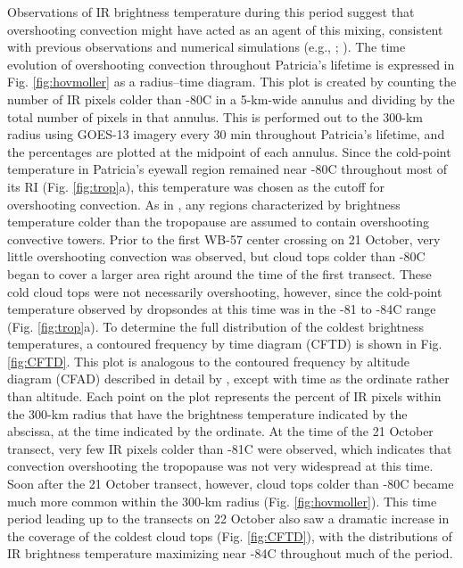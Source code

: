 Observations of IR brightness temperature during this period suggest that overshooting convection might have acted as an agent of this mixing, consistent with previous observations and numerical simulations (e.g., \citeauthor{Danielsen1993} \citeyear{Danielsen1993}; \citeauthor{Salbyetal2003} \citeyear{Salbyetal2003}).
The time evolution of overshooting convection throughout Patricia’s lifetime is expressed in Fig. \ref{fig:hovmoller}  as a radius--time diagram.
This plot is created by counting the number of IR pixels colder than -80\textdegree{}C in a 5-km-wide annulus and dividing by the total number of pixels in that annulus.
This is performed out to the 300-km radius using GOES-13 imagery every 30 min throughout Patricia’s lifetime, and the percentages are plotted at the midpoint of each annulus.
Since the cold-point temperature in Patricia’s eyewall region remained near -80\textdegree{}C throughout most of its RI (Fig. \ref{fig:trop}a), this temperature was chosen as the cutoff for overshooting convection.
As in \cite{EbertHolland1992}, any regions characterized by brightness temperature colder than the tropopause are assumed to contain overshooting convective towers.
Prior to the first WB-57 center crossing on 21 October, very little overshooting convection was observed, but cloud tops colder than -80\textdegree{}C began to cover a larger area right around the time of the first transect.
These cold cloud tops were not necessarily overshooting, however, since the cold-point temperature observed by dropsondes at this time was in the -81\textdegree{} to -84\textdegree{}C range (Fig. \ref{fig:trop}a).
To determine the full distribution of the coldest brightness temperatures, a contoured frequency by time diagram (CFTD) is shown in Fig. \ref{fig:CFTD}.
This plot is analogous to the contoured frequency by altitude diagram (CFAD) described in detail by \cite{YuterHouze1995}, except with time as the ordinate rather than altitude.
Each point on the plot represents the percent of IR pixels within the 300-km radius that have the brightness temperature indicated by the abscissa, at the time indicated by the ordinate.
At the time of the 21 October transect, very few IR pixels colder than -81\textdegree{}C were observed, which indicates that convection overshooting the tropopause was not very widespread at this time.
Soon after the 21 October transect, however, cloud tops colder than -80\textdegree{}C became much more common within the 300-km radius (Fig. \ref{fig:hovmoller}).
This time period leading up to the transects on 22 October also saw a dramatic increase in the coverage of the coldest cloud tops (Fig. \ref{fig:CFTD}), with the distributions of IR brightness temperature maximizing near -84\textdegree{}C throughout much of the period.
